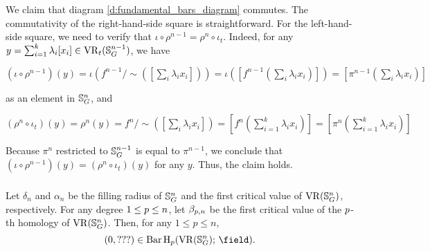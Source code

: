 We claim that diagram \eqref{d:fundamental_bars_diagram} commutes. 
The commutativity of the right-hand-side square is straightforward.
For the left-hand-side square, we need to verify that $\iota \circ \rho^{n-1}=\rho^{n} \circ \iota_t$.
Indeed, for any $y = \sum_{i=1}^k \lambda_i [x_i] \in \operatorname{VR}_t(\mathbb{S}^{n-1}_G)$, we have
\begin{center}
    $(\iota \circ \rho^{n-1})(y)
    =\iota(f^{n-1}/\sim([\sum_i \lambda_i x_i]))
    =\iota([f^{n-1}(\sum_i \lambda_i x_i)])
    =[\pi^{n-1}(\sum_i \lambda_i x_i)]
    $
\end{center}
as an element in $\mathbb{S}^n_G$, and
\begin{center}
    $(\rho^{n} \circ \iota_t)(y) = \rho^{n}(y) = f^{n}/\sim([\sum_i \lambda_i x_i]) = [f^{n}(\sum_{i=1}^k \lambda_i x_i)] = [\pi^{n}(\sum_{i=1}^k \lambda_i x_i)]
    $
\end{center}
Because $\pi^{n}$ restricted to $\mathbb{S}^{n-1}_G$ is equal to $\pi^{n-1}$, we conclude that $(\iota \circ \rho^{n-1})(y) = (\rho^n \circ \iota_t)(y)$ for any $y$.
Thus, the claim holds.

\subsubsection{}
\label{subsub:foundamental_bar_rpn}

\lemma 
Let $\delta_n$ and $\alpha_n$ be the filling radius of $\mathbb{S}^n_G$ and the first critical value of $\operatorname{VR}(\mathbb{S}^n_G)$, respectively.
For any degree $1 \leq p \leq n$, let $\beta_{p, n}$ be the first critical value of the $p$-th homology of $\operatorname{VR}(\mathbb{S}^n_G)$.
Then, for any $1 \leq p \leq n$,
\[
(0, ???) \in \Hbarc[\field]{\degp}{\bS^n_G}.
\]

